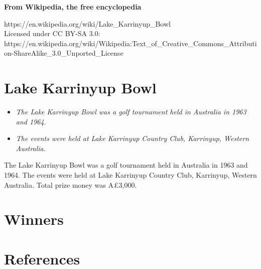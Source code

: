 \textbf{From Wikipedia, the free encyclopedia}

https://en.wikipedia.org/wiki/Lake\_Karrinyup\_Bowl\\
Licensed under CC BY-SA 3.0:\\
https://en.wikipedia.org/wiki/Wikipedia:Text\_of\_Creative\_Commons\_Attribution-ShareAlike\_3.0\_Unported\_License

\section{Lake Karrinyup Bowl}\label{lake-karrinyup-bowl}

\begin{itemize}
\item
  \emph{The Lake Karrinyup Bowl was a golf tournament held in Australia
  in 1963 and 1964.}
\item
  \emph{The events were held at Lake Karrinyup Country Club, Karrinyup,
  Western Australia.}
\end{itemize}

The Lake Karrinyup Bowl was a golf tournament held in Australia in 1963
and 1964. The events were held at Lake Karrinyup Country Club,
Karrinyup, Western Australia. Total prize money was A£3,000.

\section{Winners}\label{winners}

\section{References}\label{references}
